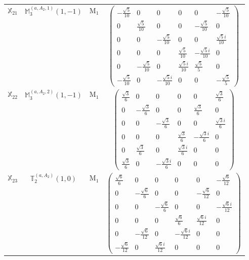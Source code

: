 \documentclass[fleqn,10pt,landscape]{article}
\begin{document}
\begin{itemize}
\begin{center}
\begin{longtable}{c|c|c|c}
$ \mathbb{X}_{21} $ & $\mathbb{M}_{3}^{(a,A_{2},1)}(1,-1)$ & M$_{1}$ & $\begin{pmatrix} - \frac{\sqrt{5}}{10} & 0 & 0 & 0 & 0 & - \frac{\sqrt{5}}{10} \\ 0 & \frac{\sqrt{5}}{10} & 0 & 0 & - \frac{\sqrt{5}}{10} & 0 \\ 0 & 0 & - \frac{\sqrt{5}}{10} & 0 & 0 & \frac{\sqrt{5} i}{10} \\ 0 & 0 & 0 & \frac{\sqrt{5}}{10} & - \frac{\sqrt{5} i}{10} & 0 \\ 0 & - \frac{\sqrt{5}}{10} & 0 & \frac{\sqrt{5} i}{10} & \frac{\sqrt{5}}{5} & 0 \\ - \frac{\sqrt{5}}{10} & 0 & - \frac{\sqrt{5} i}{10} & 0 & 0 & - \frac{\sqrt{5}}{5} \end{pmatrix}$ \\
$ \mathbb{X}_{22} $ & $\mathbb{M}_{3}^{(a,A_{2},2)}(1,-1)$ & M$_{1}$ & $\begin{pmatrix} \frac{\sqrt{3}}{6} & 0 & 0 & 0 & 0 & \frac{\sqrt{3}}{6} \\ 0 & - \frac{\sqrt{3}}{6} & 0 & 0 & \frac{\sqrt{3}}{6} & 0 \\ 0 & 0 & - \frac{\sqrt{3}}{6} & 0 & 0 & \frac{\sqrt{3} i}{6} \\ 0 & 0 & 0 & \frac{\sqrt{3}}{6} & - \frac{\sqrt{3} i}{6} & 0 \\ 0 & \frac{\sqrt{3}}{6} & 0 & \frac{\sqrt{3} i}{6} & 0 & 0 \\ \frac{\sqrt{3}}{6} & 0 & - \frac{\sqrt{3} i}{6} & 0 & 0 & 0 \end{pmatrix}$ \\
$ \mathbb{X}_{23} $ & $\mathbb{T}_{2}^{(a,A_{2})}(1,0)$ & M$_{1}$ & $\begin{pmatrix} \frac{\sqrt{6}}{6} & 0 & 0 & 0 & 0 & - \frac{\sqrt{6}}{12} \\ 0 & - \frac{\sqrt{6}}{6} & 0 & 0 & - \frac{\sqrt{6}}{12} & 0 \\ 0 & 0 & - \frac{\sqrt{6}}{6} & 0 & 0 & - \frac{\sqrt{6} i}{12} \\ 0 & 0 & 0 & \frac{\sqrt{6}}{6} & \frac{\sqrt{6} i}{12} & 0 \\ 0 & - \frac{\sqrt{6}}{12} & 0 & - \frac{\sqrt{6} i}{12} & 0 & 0 \\ - \frac{\sqrt{6}}{12} & 0 & \frac{\sqrt{6} i}{12} & 0 & 0 & 0 \end{pmatrix}$ \\

\end{longtable}
\end{center}
\end{itemize}
\end{document}
